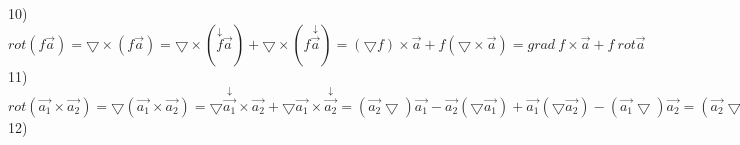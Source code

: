 \documentclass[12pt]{article}
\begin{document}
10) $rot(f\overrightarrow{a}) = \bigtriangledown \times (f\overrightarrow{a}) = \bigtriangledown \times (\overset{\downarrow}{f}\overrightarrow{a}) + \bigtriangledown \times (f\overset{\downarrow}{\overrightarrow{a}}) = ({\bigtriangledown f}) \times \overrightarrow{a} + f(\bigtriangledown \times \overrightarrow{a})  = grad \ f \times \overrightarrow{a} + f \ rot \overrightarrow{a}$\\
11) $rot(\overrightarrow{a_1} \times \overrightarrow{a_2}) = \bigtriangledown (\overrightarrow{a_1} \times \overrightarrow{a_2}) = \bigtriangledown \overset{\downarrow}{\overrightarrow{a_1}} \times \overrightarrow{a_2} + \bigtriangledown \overrightarrow{a_1} \times \overset{\downarrow}{\overrightarrow{a_2}} = (\overrightarrow{a_2} \bigtriangledown)\overrightarrow{a_1} - \overrightarrow{a_2}(\bigtriangledown \overrightarrow{a_1}) + \overrightarrow{a_1}(\bigtriangledown  \overrightarrow{a_2}) - (\overrightarrow{a_1} \bigtriangledown)\overrightarrow{a_2} = (\overrightarrow{a_2} \bigtriangledown)\overrightarrow{a_1} - \overrightarrow{a_2} div \overrightarrow{a_1} + \overrightarrow{a_1} div \overrightarrow{a_2} - (\overrightarrow{a_1} \bigtriangledown)\overrightarrow{a_2}$\\
12) 
\end{document}
